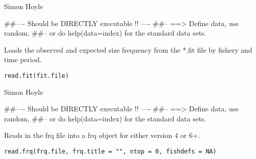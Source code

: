 \documentclass[a4paper]{book}
\begin{document}
%
\begin{Author}\relax

Simon Hoyle
\end{Author}
%
\begin{Examples}
\begin{ExampleCode}
##---- Should be DIRECTLY executable !! ----
##-- ==>  Define data, use random,
##--	or do  help(data=index)  for the standard data sets.

\end{ExampleCode}
\end{Examples}
%
\begin{Description}\relax

Loads the observed and expected size frequency from the *.fit file by fishery and time period. 
\end{Description}
%
\begin{Usage}
\begin{verbatim}
read.fit(fit.file)
\end{verbatim}
\end{Usage}
%
\begin{Arguments}
\begin{ldescription}
\item[\code{fit.file}] 


\end{ldescription}
\end{Arguments}
%
\begin{Author}\relax

Simon Hoyle
\end{Author}
%
\begin{Examples}
\begin{ExampleCode}
##---- Should be DIRECTLY executable !! ----
##-- ==>  Define data, use random,
##--	or do  help(data=index)  for the standard data sets.

\end{ExampleCode}
\end{Examples}
%
\begin{Description}\relax

Reads in the frq file into a frq object for either version 4 or 6+. 
\end{Description}
%
\begin{Usage}
\begin{verbatim}
read.frq(frq.file, frq.title = "", ntop = 0, fishdefs = NA)
\end{verbatim}
\end{Usage}
\end{document}
